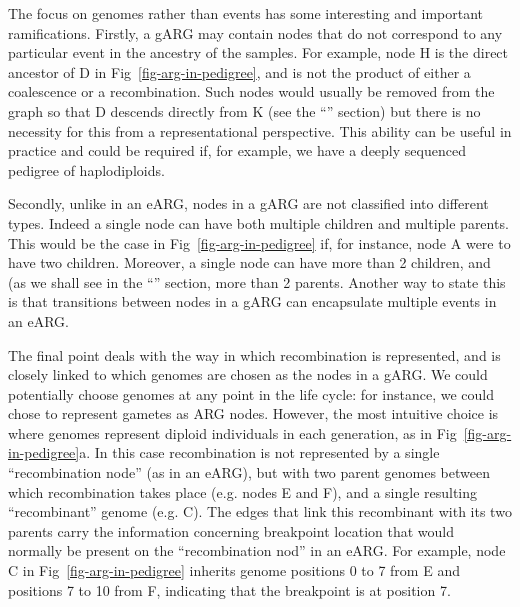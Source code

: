\documentclass{article}
\begin{document}
The focus on genomes rather than events has some interesting
and important ramifications. Firstly, a gARG may contain nodes that
do not correspond to any particular event in the ancestry of the samples.
For example, node \textsf{H} is the direct ancestor of \textsf{D} in
Fig~\ref{fig-arg-in-pedigree}, and is not the product of either a
coalescence or a recombination. Such nodes would usually be removed
from the graph so that \textsf{D} descends directly from \textsf{K} (see
the ``'' section) but there is no necessity for this from
a representational perspective. This ability can be useful in practice and could be
required if, for example, we have a deeply sequenced pedigree of haplodiploids.

Secondly, unlike in an eARG, nodes in a gARG are not classified into different
types. Indeed a single node can have both multiple children
and multiple parents. This would be the case in Fig~\ref{fig-arg-in-pedigree} if,
for instance, node \textsf{A} were to have two children.
Moreover, a single node can have more than 2 children, and (as we shall see in
the ``'' section, more than 2 parents. Another way to
state this is that transitions between nodes in a gARG can encapsulate multiple
events in an eARG.

The final point deals with the way in which recombination is represented, and is
closely linked to which genomes are chosen as the nodes in a gARG.
We could potentially choose genomes at any point in the life cycle: for instance,
we could chose to represent gametes as ARG nodes. However, the most intuitive
choice is where genomes represent diploid individuals in each generation, as in
Fig~\ref{fig-arg-in-pedigree}a. In this case recombination
is not represented by a single ``recombination node'' (as in an eARG), but with
two parent genomes between which recombination takes place (e.g.
nodes \textsf{E} and \textsf{F}), and a
single resulting ``recombinant'' genome (e.g. \textsf{C}). The
edges that link this recombinant with its two parents carry the information
concerning breakpoint location that would normally be present on the
``recombination nod'' in an eARG. For example, node \textsf{C} in
Fig~\ref{fig-arg-in-pedigree} inherits genome positions 0 to 7 from \textsf{E}
and positions 7 to 10 from \textsf{F}, indicating that the breakpoint is at position 7.
\end{document}
